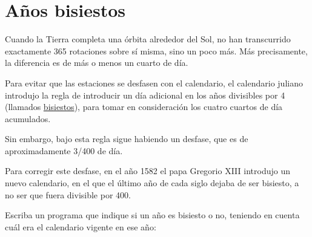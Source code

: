 \section{Años bisiestos}

Cuando la Tierra completa una órbita alrededor del Sol, no han
transcurrido exactamente 365 rotaciones sobre sí misma, sino un poco
más. Más precisamente, la diferencia es de más o menos un cuarto de día.

Para evitar que las estaciones se desfasen con el calendario, el
calendario juliano introdujo la regla de introducir un día adicional en
los años divisibles por 4 (llamados
\href{http://es.wikipedia.org/wiki/A\%C3\%B1o\_bisiesto}{bisiestos}),
para tomar en consideración los cuatro cuartos de día acumulados.

Sin embargo, bajo esta regla sigue habiendo un desfase, que es de
aproximadamente 3/400 de día.

Para corregir este desfase, en el año 1582 el papa Gregorio XIII
introdujo un nuevo calendario, en el que el último año de cada siglo
dejaba de ser bisiesto, a no ser que fuera divisible por 400.

Escriba un programa que indique si un año es bisiesto o no, teniendo en
cuenta cuál era el calendario vigente en ese año:

